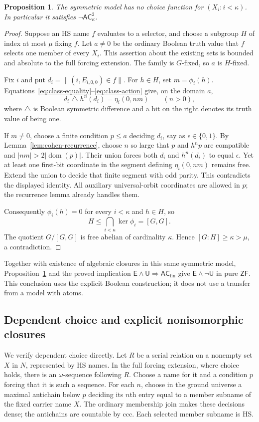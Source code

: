 \documentclass[11pt,a4paper]{article}
\newtheorem{proposition}[theorem]{Proposition}
\theoremstyle{definition}\newtheorem{definition}[theorem]{Definition}
\theoremstyle{remark}\newtheorem{remark}[theorem]{Remark}
\newcommand{\ZF}{\mathsf{ZF}}\newcommand{\ZFA}{\mathsf{ZFA}}
\newcommand{\E}{\mathsf E}\newcommand{\U}{\mathsf U}
\newcommand{\ACfin}{\mathsf{AC}_{\mathrm{fin}}}
\begin{document}
\begin{proposition}\label{prop:boolean-no-pairs}
The symmetric model has no choice function for $(X_i:i<\kappa)$. In particular it satisfies $\neg\mathsf{AC}_{\kappa}^{2}$.
\end{proposition}
\begin{proof}
Suppose an HS name $f$ evaluates to a selector, and choose a subgroup $H$ of index at most $\mu$ fixing $f$. Let $a\ne0$ be the ordinary Boolean truth value that $f$ selects one member of every $X_i$. This assertion about the existing sets is bounded and absolute to the full forcing extension. The family is $G$-fixed, so $a$ is $H$-fixed.

Fix $i$ and put $d_i=\lVert (i,E_{i,0,0})\in f\rVert$. For $h\in H$, set $m=\phi_i(h)$. Equations~\eqref{eq:class-equality}--\eqref{eq:class-action} give, on the domain $a$,
\[
d_i\mathbin{\triangle}h^n(d_i)=\eta_i(0,nm) \qquad(n>0),
\]
where $\triangle$ is Boolean symmetric difference and a bit on the right denotes its truth value of being one.

If $m\ne0$, choose a finite condition $p\leq a$ deciding $d_i$, say as $\epsilon\in\{0,1\}$. By Lemma~\ref{lem:cohen-recurrence}, choose $n$ so large that $p$ and $h^np$ are compatible and $|nm|>2|\operatorname{dom}(p)|$. Their union forces both $d_i$ and $h^n(d_i)$ to equal $\epsilon$. Yet at least one first-bit coordinate in the segment defining $\eta_i(0,nm)$ remains free. Extend the union to decide that finite segment with odd parity. This contradicts the displayed identity. All auxiliary universal-orbit coordinates are allowed in $p$; the recurrence lemma already handles them.

Consequently $\phi_i(h)=0$ for every $i<\kappa$ and $h\in H$, so
\[
H\leq\bigcap_{i<\kappa}\ker\phi_i=[G,G].
\]
The quotient $G/[G,G]$ is free abelian of cardinality $\kappa$. Hence $[G:H]\geq\kappa>\mu$, a contradiction.
\end{proof}

Together with existence of algebraic closures in this same symmetric model, Proposition~\ref{prop:boolean-no-pairs} and the proved implication $\E\wedge\U\Rightarrow\ACfin$ give $\E\wedge\neg\U$ in pure $\ZF$. This conclusion uses the explicit Boolean construction; it does not use a transfer from a model with atoms.

\subsection{Dependent choice and explicit nonisomorphic closures}
We verify dependent choice directly. Let $R$ be a serial relation on a nonempty set $X$ in $N$, represented by HS names. In the full forcing extension, where choice holds, there is an $\omega$-sequence following $R$. Choose a name for it and a condition $p$ forcing that it is such a sequence. For each $n$, choose in the ground universe a maximal antichain below $p$ deciding its $n$th entry equal to a member subname of the fixed carrier name $X$. The ordinary membership join makes these decisions dense; the antichains are countable by ccc. Each selected member subname is HS.
\end{document}
